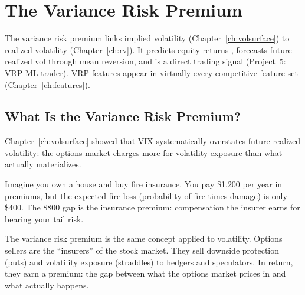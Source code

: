 \chapter{The Variance Risk Premium}
\label{ch:vrp}

\begin{application}
The variance risk premium links implied volatility (Chapter~\ref{ch:volsurface}) to realized volatility (Chapter~\ref{ch:rv}).
It predicts equity returns \citep{BTZ2009}, forecasts future realized vol through mean reversion, and is a direct trading signal (Project~5: VRP ML trader).
VRP features appear in virtually every competitive feature set (Chapter~\ref{ch:features}).
\end{application}

\section{What Is the Variance Risk Premium?}
\label{sec:vrp-definition}

Chapter~\ref{ch:volsurface} showed that VIX systematically overstates future realized volatility: the options market charges more for volatility exposure than what actually materializes.

Imagine you own a house and buy fire insurance.
You pay \$1{,}200 per year in premiums, but the expected fire loss (probability of fire times damage) is only \$400.
The \$800 gap is the insurance premium: compensation the insurer earns for bearing your tail risk.

The variance risk premium is the same concept applied to volatility.
Options sellers are the ``insurers'' of the stock market.
They sell downside protection (puts) and volatility exposure (straddles) to hedgers and speculators.
In return, they earn a premium: the gap between what the options market prices in and what actually happens.

